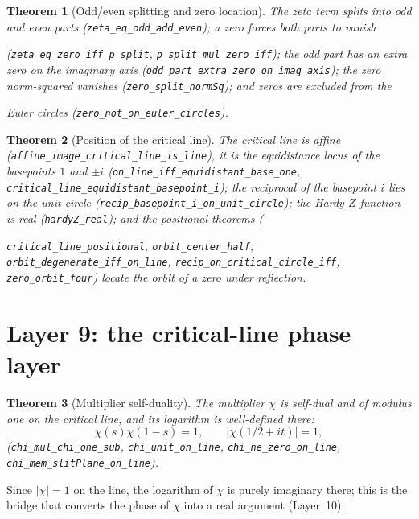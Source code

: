 \documentclass{article}
\newtheorem{theorem}{Theorem}[section]
\newcommand{\Xchi}{\chi}
\begin{document}
\begin{theorem}[Odd/even splitting and zero location]
\label{thm:split}
The zeta term splits into odd and even parts
(\texttt{zeta\_eq\_odd\_add\_even}); a zero forces both parts to vanish
\begin{sloppypar}(\texttt{zeta\_eq\_zero\_iff\_p\_split}, \texttt{p\_split\_mul\_zero\_iff});
the odd part has an extra zero on the imaginary axis
(\texttt{odd\_part\_extra\_zero\_on\_imag\_axis}); the zero norm-squared
vanishes (\texttt{zero\_split\_normSq}); and zeros are excluded from the\end{sloppypar}
Euler circles (\texttt{zero\_not\_on\_euler\_circles}).
\end{theorem}

\begin{theorem}[Position of the critical line]
\label{thm:position}
The critical line is affine (\texttt{affine\_image\_critical\_line\_is\_line}),
it is the equidistance locus of the basepoints $1$ and $\pm i$
(\texttt{on\_line\_iff\_equidistant\_base\_one},
\texttt{critical\_line\_equidistant\_basepoint\_i}); the reciprocal of the
basepoint $i$ lies on the unit circle
(\texttt{recip\_basepoint\_i\_on\_unit\_circle}); the Hardy $Z$-function is
real (\texttt{hardyZ\_real}); and the positional theorems
(\begin{sloppypar}\texttt{critical\_line\_positional}, \texttt{orbit\_center\_half},
\texttt{orbit\_degenerate\_iff\_on\_line},
\texttt{recip\_on\_critical\_circle\_iff}, \texttt{zero\_orbit\_four})
locate the orbit of a zero under reflection.\end{sloppypar}
\end{theorem}

\section{Layer 9: the critical-line phase layer}
\label{sec:L9}

\begin{theorem}[Multiplier self-duality]
\label{thm:chidual}
The multiplier $\Xchi$ is self-dual and of modulus one on the critical
line, and its logarithm is well-defined there:
\[
\Xchi(s)\Xchi(1-s)=1,\qquad |\Xchi(1/2+it)|=1,
\]
(\texttt{chi\_mul\_chi\_one\_sub}, \texttt{chi\_unit\_on\_line},
\texttt{chi\_ne\_zero\_on\_line}, \texttt{chi\_mem\_slitPlane\_on\_line}).
\end{theorem}

Since $|\Xchi|=1$ on the line, the logarithm of $\Xchi$ is purely imaginary
there; this is the bridge that converts the phase of $\Xchi$ into a real
argument (Layer~10).
\end{document}
